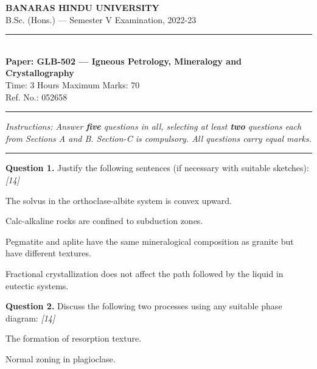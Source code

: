 \documentclass[11pt,a4paper]{article}
\newcommand{\pts}[1]{\hfill   \textit{[#1]}}
\begin{document}
\begin{center}
  {\large\bfseries BANARAS HINDU UNIVERSITY}\\[2pt]
  {\normalsize B.Sc. (Hons.) --- Semester V Examination, 2022-23}\\[6pt]
  \rule{0.8\linewidth}{0.5pt}\\[6pt]
  {\large\bfseries Paper: GLB-502 --- Igneous Petrology, Mineralogy and Crystallography}\\[4pt]
  {\normalsize Time: 3 Hours \hfill Maximum Marks: 70}\\[2pt]
  {\small Ref. No.: 052658}
\end{center}
\rule{\linewidth}{0.4pt}
\smallskip



\noindent   \textit{Instructions: Answer   \textbf{five} questions in all, selecting at least   \textbf{two} questions each from Sections A and B. Section-C is compulsory. All questions carry equal marks.}
\bigskip

\bigskip


\rule{\linewidth}{0.4pt}\smallskip




\noindent   \textbf{Question 1.} Justify the following sentences (if necessary with suitable sketches): \pts{14}

\begin{parts}
  \item The solvus in the orthoclase-albite system is convex upward.
  \item Calc-alkaline rocks are confined to subduction zones.
  \item Pegmatite and aplite have the same mineralogical composition as granite but have different textures.
  \item Fractional crystallization does not affect the path followed by the liquid in eutectic systems.
\end{parts}

\medskip


\noindent   \textbf{Question 2.} Discuss the following two processes using any suitable phase diagram: \pts{14}

\begin{parts}
  \item The formation of resorption texture.
  \item Normal zoning in plagioclase.
\end{parts}

\medskip
\end{document}
